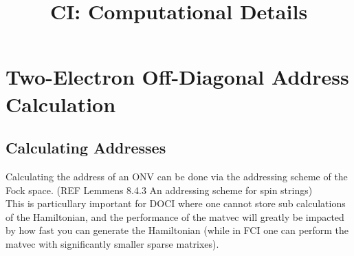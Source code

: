 \documentclass[12p]{article}
\title{CI: Computational Details}
\author{}
\begin{document}
\maketitle

\section{Two-Electron Off-Diagonal Address Calculation}


\subsection{Calculating Addresses}
Calculating the address of an ONV can be done via the addressing scheme of the Fock space.
(REF Lemmens 8.4.3 An addressing scheme for spin strings) \\
This is particullary important for DOCI where one cannot store sub calculations of the Hamiltonian, and the performance of the matvec will greatly be impacted by how fast you can generate the Hamiltonian (while in FCI one can perform the matvec with significantly smaller sparse matrixes).
\end{document}
